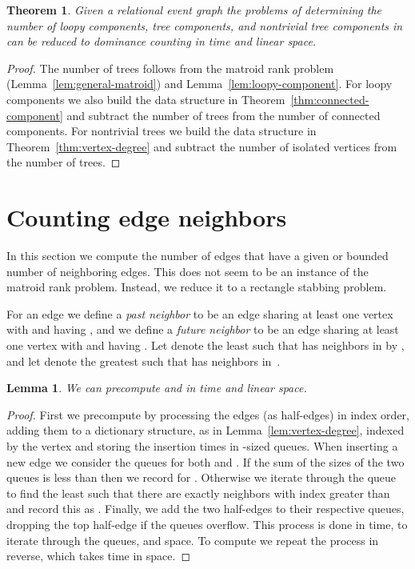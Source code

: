 \documentclass[11pt]{article}
\newtheorem{lemma}{Lemma}
\newtheorem{theorem}{Theorem}
\begin{document}
\begin{theorem}
Given a relational event graph  the problems of determining the number of loopy components, tree components, and nontrivial tree components in  can be reduced to dominance counting in  time and linear space.
\end{theorem}
\begin{proof}
The number of trees follows from the matroid rank problem (Lemma~\ref{lem:general-matroid}) and Lemma~\ref{lem:loopy-component}. For loopy components we also build the data structure in Theorem~\ref{thm:connected-component} and subtract the number of trees from the number of connected components. For nontrivial trees we build the data structure in Theorem~\ref{thm:vertex-degree} and subtract the number of isolated vertices from the number of trees.
\end{proof}

\section{Counting edge neighbors}
In this section we compute the number of edges that have a given or bounded number of neighboring edges. This does not seem to be an instance of the matroid rank problem. Instead, we reduce it to a rectangle stabbing problem.

For an edge  we define a \emph{past neighbor} to be an edge  sharing at least one vertex with   and having , and we define a \emph{future neighbor} to be an edge  sharing at least one vertex with  and having . Let  denote the least  such that  has  neighbors in  by , and let  denote the greatest  such that  has  neighbors in~.

\begin{lemma}
We can precompute  and  in  time and linear space.
\end{lemma}
\begin{proof}
First we precompute  by processing the edges (as half-edges) in index order, adding them to a dictionary structure, as in Lemma~\ref{lem:vertex-degree}, indexed by the vertex and storing the insertion times in -sized queues. When inserting a new edge  we consider the queues for both  and . If the sum of the sizes of the two queues is less than  then we record  for . Otherwise we iterate through the queue to find the least  such that there are exactly  neighbors with index greater than  and record this as . Finally, we add the two half-edges to their respective queues, dropping the top half-edge if the queues overflow. This process is done in  time,  to iterate through the queues, and  space. To compute  we repeat the process in reverse, which takes  time in  space.
\end{proof}
\end{document}
